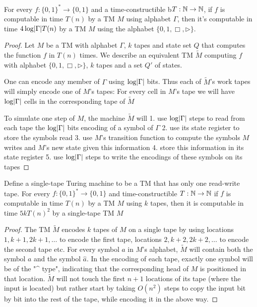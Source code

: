 \documentclass[11pt]{article}
\begin{document}
\begin{enumerate}
\begin{proposition}[]
For every \(f:\{0,1\}^*\to\{0,1\}\) and a time-constructible b\(T:\mathbb{N}\to\mathbb{N}\), if \(f\) is
computable in time \(T(n)\) by a TM \(M\) using alphabet \(\Gamma\), then it's computable in time
\(4\log\abs{\Gamma}T(n)\) by a TM \(M\) using the alphabet \(\{0,1,\Box,\rhd\}\).
\end{proposition}

\begin{proof}
Let \(M\) be a TM with alphabet \(\Gamma\), \(k\) tapes and state set \(Q\) that computes the
function \(f\) in \(T(n)\) times. We describe an equivalent TM \(\tilde{M}\) computing \(f\)
with alphabet \(\{0,1,\Box,\rhd\}\), \(k\) tapes and a set \(Q'\) of states.

One can encode any member of \(\Gamma\) using \(\log\abs{\Gamma}\) bits. Thus each of \(\tilde{M}\)'s work
tapes will simply encode one of \(M\)'s tapes: For every cell in \(M\)'s tape we will
have \(\log\abs{\Gamma}\) cells in the corresponding tape of \(\tilde{M}\)

To simulate one step of \(M\), the machine \(\tilde{M}\) will 1. use \(\log\abs{\Gamma}\) steps to
read from each tape the \(\log\abs{\Gamma}\) bits encoding of a symbol of \(\Gamma\) 2. use its state register
to store the symbols read 3. use \(M\)'s transition function to compute the symbols \(M\) writes
and \(M\)'s new state given this information 4. store this information in its state register 5.
use \(\log\abs{\Gamma}\) steps to write the encodings of these symbols on its tapes
\end{proof}

\begin{proposition}[]
\label{prop1.6}
Define a single-tape Turing machine to be a TM that has only one read-write tape. For every
\(f:\{0,1\}^*\to\{0,1\}\) and time-constructible \(T:\mathbb{N}\to\mathbb{N}\) if \(f\) is computable in
time \(T(n)\) by a TM \(M\) using \(k\) tapes, then it is computable in time \(5kT(n)^2\) by a
single-tape TM \(M\)
\end{proposition}

\begin{proof}
The TM \(\tilde{M}\) encodes \(k\) tapes of \(M\) on a single tape by using
locations \(1,k+1,2k+1,\dots\) to encode the first tape, locations \(2,k+2,2k+2,\dots\) to
encode the second tape etc. For every symbol \(a\) in \(M\)'s alphabet, \(\tilde{M}\) will
contain both the symbol \(a\) and the symbol \(\hat{a}\). In the encoding of each tape, exactly
one symbol will be of the "\^{} type", indicating that the corresponding head of \(M\) is
positioned in that location. \(\tilde{M}\) will not touch the first \(n+1\) locations of its
tape (where the input is located) but rather start by taking \(O(n^2)\) steps to copy the input
bit by bit into the rest of the tape, while encoding it in the above way.
\end{proof}


\end{enumerate}
\end{document}
